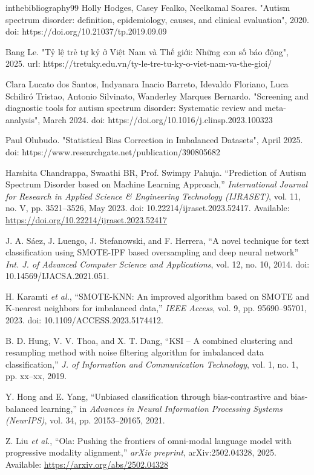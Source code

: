 in{thebibliography}{99}
 Holly Hodges, Casey Fealko, Neelkamal Soares. "Autism spectrum disorder: definition, epidemiology, causes, and clinical evaluation", 2020. doi: https://doi.org/10.21037/tp.2019.09.09

 Bang Le. "Tỷ lệ trẻ tự kỷ ở Việt Nam và Thế giới: Những con số báo động", 2025. url: https://tretuky.edu.vn/ty-le-tre-tu-ky-o-viet-nam-va-the-gioi/

 Clara Lucato dos Santos, Indyanara Inacio Barreto, Idevaldo Floriano, Luca Schiliró Tristao, Antonio Silvinato, Wanderley Marques Bernardo. "Screening and diagnostic tools for autism spectrum disorder: Systematic review and meta-analysis", March 2024. doi: https://doi.org/10.1016/j.clinsp.2023.100323

 Paul Olubudo. "Statistical Bias Correction in Imbalanced Datasets", April 2025. doi: https://www.researchgate.net/publication/390805682

 Harshita Chandrappa, Swaathi BR, Prof. Swimpy Pahuja. ``Prediction of Autism Spectrum Disorder based on Machine Learning Approach,'' \textit{International Journal for Research in Applied Science \& Engineering Technology (IJRASET)}, vol. 11, no. V, pp. 3521–3526, May 2023. doi: 10.22214/ijraset.2023.52417. Available: \url{https://doi.org/10.22214/ijraset.2023.52417}

 J. A. Sáez, J. Luengo, J. Stefanowski, and F. Herrera, ``A novel technique for text classification using SMOTE-IPF based oversampling and deep neural network'' \textit{Int. J. of Advanced Computer Science and Applications}, vol. 12, no. 10, 2014. doi: 10.14569/IJACSA.2021.051.

 H. Karamti \textit{et al.}, ``SMOTE-KNN: An improved algorithm based on SMOTE and K-nearest neighbors for imbalanced data,'' \textit{IEEE Access}, vol. 9, pp. 95690--95701, 2023. doi: 10.1109/ACCESS.2023.5174412.

 B. D. Hung, V. V. Thoa, and X. T. Dang, ``KSI – A combined clustering and resampling method with noise filtering algorithm for imbalanced data classification,'' \textit{J. of Information and Communication Technology}, vol. 1, no. 1, pp. xx--xx, 2019.

 Y. Hong and E. Yang, ``Unbiased classification through bias-contrastive and bias-balanced learning,'' in \textit{Advances in Neural Information Processing Systems (NeurIPS)}, vol. 34, pp. 20153--20165, 2021.

 Z. Liu \textit{et al.}, ``Ola: Pushing the frontiers of omni-modal language model with progressive modality alignment,'' \textit{arXiv preprint}, arXiv:2502.04328, 2025. Available: \url{https://arxiv.org/abs/2502.04328}

